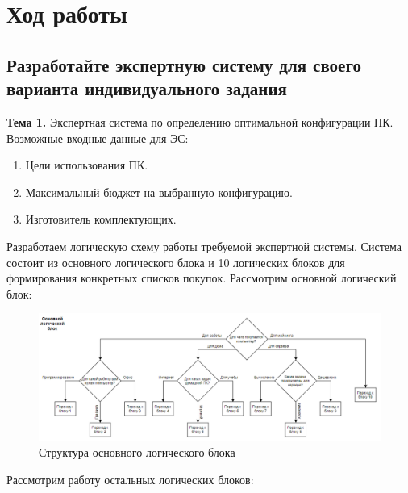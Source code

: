 \documentclass[14pt,a4paper,report]{report}
\begin{document}
\clearpage

\section{Ход работы}

\subsection{Разработайте экспертную систему для своего варианта индивидуального задания}

\textbf{Тема 1.} Экспертная система по определению оптимальной конфигурации ПК. Возможные входные данные для ЭС:

\begin{enumerate}
	\item Цели использования ПК.
	\item Максимальный бюджет на выбранную конфигурацию.
	\item Изготовитель комплектующих.
\end{enumerate}

Разработаем логическую схему работы требуемой экспертной системы. Система состоит из основного логического блока и 10 логических блоков для формирования конкретных списков покупок. Рассмотрим основной логический блок:

\begin{figure}[h!]
	\centering
	\includegraphics[scale = 0.55]{images/0_1.png}
	\caption{Структура основного логического блока}
\end{figure}

Рассмотрим работу остальных логических блоков:
\end{document}
